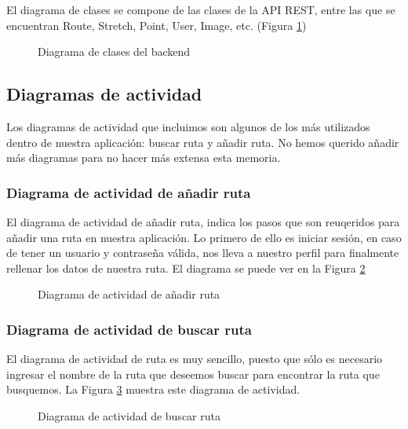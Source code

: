 \documentclass[11pt,a4paper]{article}
\begin{document}
El diagrama de clases se compone de las clases de la API REST, entre las que se encuentran Route, Stretch, Point, User, Image, etc. (Figura \ref{fig:clases_backend})

\begin{figure}
\centering
\clasesbackend
\caption{Diagrama de clases del backend}
\label{fig:clases_backend}
\end{figure}

\subsection{Diagramas de actividad}

Los diagramas de actividad que incluimos son algunos de los más utilizados dentro de nuestra aplicación: buscar ruta y añadir ruta. No hemos querido añadir más diagramas para no hacer más extensa esta memoria.


\subsubsection{Diagrama de actividad de añadir ruta}

El diagrama de actividad de añadir ruta, indica los pasos que son reuqeridos para añadir una ruta en nuestra aplicación. Lo primero de ello es iniciar sesión, en caso de tener un usuario y contraseña válida, nos lleva a nuestro perfil para finalmente rellenar los datos de nuestra ruta. El diagrama se puede ver en la Figura \ref{fig:anadirruta}

\begin{figure}[htbp]
\centering
\anadirruta
\caption{Diagrama de actividad de añadir ruta}
\label{fig:anadirruta}
\end{figure}


\subsubsection{Diagrama de actividad de buscar ruta}

El diagrama de actividad de ruta es muy sencillo, puesto que sólo es necesario ingresar el nombre de la ruta que deseemos buscar para encontrar la ruta que busquemos. La Figura \ref{fig:buscarruta} muestra este diagrama de actividad.  

\begin{figure}
\centering
\buscarruta
\caption{Diagrama de actividad de buscar ruta}
\label{fig:buscarruta}
\end{figure}
\end{document}
